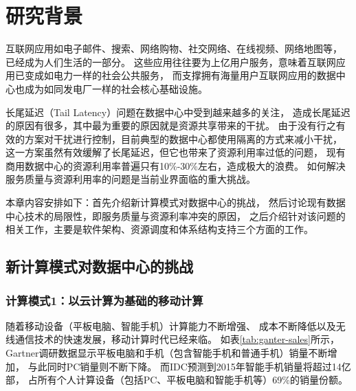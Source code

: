

\chapter{研究背景}
\label{chap:background}

互联网应用如电子邮件、搜索、网络购物、社交网络、在线视频、网络地图等，
已经成为人们生活的一部分。
这些应用往往要为上亿用户服务，意味着互联网应用已变成如电力一样的社会公共服务，
而支撑拥有海量用户互联网应用的数据中心也成为如同发电厂一样的社会核心基础设施。

长尾延迟（Tail Latency）问题在数据中心中受到越来越多的关注，
造成长尾延迟的原因有很多，其中最为重要的原因就是资源共享带来的干扰。
由于没有行之有效的方案对干扰进行控制，目前典型的数据中心都使用隔离的方式来减小干扰，
这一方案虽然有效缓解了长尾延迟，但它也带来了资源利用率过低的问题，
现有商用数据中心的资源利用率普遍只有10\%-30\%左右，造成极大的浪费。
如何解决服务质量与资源利用率的问题是当前业界面临的重大挑战。

本章内容安排如下：首先介绍新计算模式对数据中心的挑战，
然后讨论现有数据中心技术的局限性，即服务质量与资源利率冲突的原因，
之后介绍针对该问题的相关工作，主要是软件架构、资源调度和体系结构支持三个方面的工作。

%

\section{新计算模式对数据中心的挑战}

\subsection*{计算模式1：以云计算为基础的移动计算}

随着移动设备（平板电脑、智能手机）计算能力不断增强、
成本不断降低以及无线通信技术的快速发展，移动计算时代已经来临。
如表\ref{tab:ganter-sales}所示，
Gartner调研数据显示平板电脑和手机（包含智能手机和普通手机）销量不断增加，
与此同时PC销量则不断下降。
而IDC预测到2015年智能手机销量将超过14亿部，
占所有个人计算设备（包括PC、平板电脑和智能手机等）69\%的销量份额。

